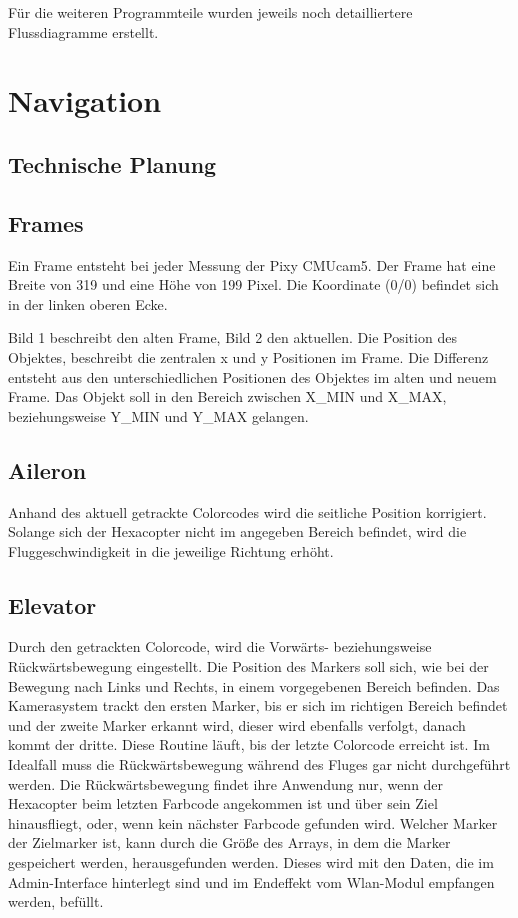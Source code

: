   Für die weiteren Programmteile wurden jeweils noch detailliertere Flussdiagramme erstellt.

\section{Navigation}

  \subsection{Technische Planung}

    \subsection*{Frames}
    Ein Frame entsteht bei jeder Messung der Pixy CMUcam5. Der Frame hat eine Breite von 319 und eine Höhe von 199 Pixel. Die Koordinate (0/0) befindet sich in der linken oberen Ecke.

    Bild 1 beschreibt den alten Frame, Bild 2 den aktuellen. Die Position des Objektes, beschreibt die zentralen x und y Positionen im Frame. Die Differenz entsteht aus den unterschiedlichen Positionen des Objektes im alten und neuem Frame. Das Objekt soll in den Bereich zwischen X\_MIN und X\_MAX, beziehungsweise Y\_MIN und Y\_MAX gelangen.


    \subsection*{Aileron}
    Anhand des aktuell getrackte Colorcodes wird die seitliche Position korrigiert. Solange sich der Hexacopter nicht im angegeben Bereich befindet, wird die Fluggeschwindigkeit in die jeweilige Richtung erhöht.

    \subsection*{Elevator}
    Durch den getrackten Colorcode, wird die Vorwärts- beziehungsweise Rückwärtsbewegung eingestellt. Die Position des Markers soll sich, wie bei der Bewegung nach Links und Rechts, in einem vorgegebenen Bereich befinden.
    Das Kamerasystem trackt den ersten Marker, bis er sich im richtigen Bereich befindet und der zweite Marker erkannt wird, dieser wird ebenfalls verfolgt, danach kommt der dritte. Diese Routine läuft, bis der letzte Colorcode erreicht ist. Im Idealfall muss die Rückwärtsbewegung während des Fluges gar nicht durchgeführt werden. Die Rückwärtsbewegung findet ihre Anwendung nur, wenn der Hexacopter beim letzten Farbcode angekommen ist und über sein Ziel hinausfliegt, oder, wenn kein nächster Farbcode gefunden wird. Welcher Marker der Zielmarker ist, kann durch die Größe des Arrays, in dem die Marker gespeichert werden, herausgefunden werden. Dieses wird mit den Daten, die im Admin-Interface hinterlegt sind und im Endeffekt vom Wlan-Modul empfangen werden, befüllt.

